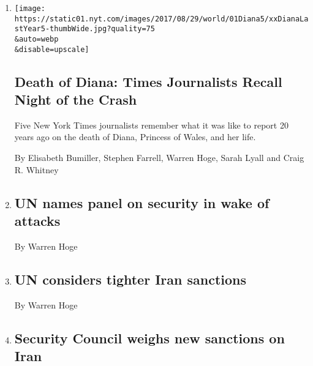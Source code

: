 \begin{enumerate}
\def\labelenumi{\arabic{enumi}.}
\item
  \href{/2017/08/30/world/europe/uk-princess-diana-20th-anniversary.html}{}

  \texttt{[image: https://static01.nyt.com/images/2017/08/29/world/01Diana5/xxDianaLastYear5-thumbWide.jpg?quality=75\\\&auto=webp\\\&disable=upscale]}

  \hypertarget{death-of-diana-times-journalists-recall-night-of-the-crash}{%
  \subsection{Death of Diana: Times Journalists Recall Night of the
  Crash}\label{death-of-diana-times-journalists-recall-night-of-the-crash}}

  Five New York Times journalists remember what it was like to report 20
  years ago on the death of Diana, Princess of Wales, and her life.

  By Elisabeth Bumiller, Stephen Farrell, Warren Hoge, Sarah Lyall and
  Craig R. Whitney
\item
  \href{/2008/02/29/news/29iht-29nations.10560014.html}{}

  \hypertarget{un-names-panel-on-security-in-wake-of-attacks}{%
  \subsection{UN names panel on security in wake of
  attacks}\label{un-names-panel-on-security-in-wake-of-attacks}}

  By Warren Hoge
\item
  \href{/2008/02/22/world/asia/22iht-iran.1.10302116.html}{}

  \hypertarget{un-considers-tighter-iran-sanctions}{%
  \subsection{UN considers tighter Iran
  sanctions}\label{un-considers-tighter-iran-sanctions}}

  By Warren Hoge
\item
  \href{/2008/02/22/news/22iht-22nations.10293669.html}{}

  \hypertarget{security-council-weighs-new-sanctions-on-iran}{%
  \subsection{Security Council weighs new sanctions on
  Iran}\label{security-council-weighs-new-sanctions-on-iran}}


\end{enumerate}
